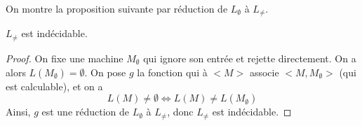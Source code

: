 On montre la proposition suivante par réduction de $L_{\emptyset}$ à $L_{\neq}$.

\begin{proposition}
$L_{\neq}$ est indécidable.
\end{proposition}

\begin{proof}
On fixe une machine $M_{\emptyset}$ qui ignore son entrée et rejette directement. On a alors $L(M_\emptyset)=\emptyset$. On pose $g$ la fonction qui à $<M>$ associe $<M,M_\emptyset>$ (qui est calculable), et on a 
$$
L(M) \neq \emptyset \Leftrightarrow L(M) \neq L(M_\emptyset)
$$
Ainsi, $g$ est une réduction de $L_{\emptyset}$ à $L_{\neq}$, donc $L_{\neq}$ est indécidable.
\end{proof}

